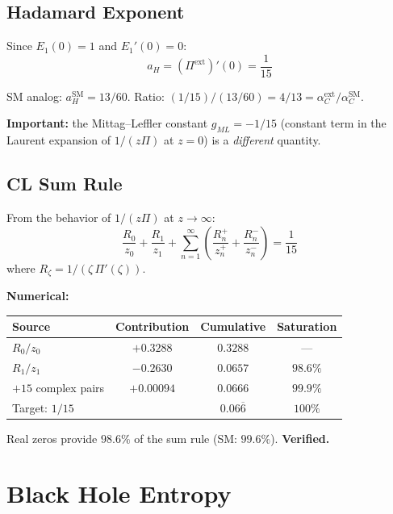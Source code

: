 \documentclass[11pt,a4paper]{article}
\newcommand{\proven}[1]{\textcolor{verified}{\textbf{#1}}}
\begin{document}
\subsection{Hadamard Exponent}

Since $E_1(0) = 1$ and $E_1'(0) = 0$:
\begin{equation}
  \boxed{a_H = (\Pi^{\mathrm{ext}})'(0) = \frac{1}{15}}
\end{equation}

SM analog: $a_H^{\mathrm{SM}} = 13/60$. Ratio: $(1/15)/(13/60) = 4/13 = \alpha_C^{\mathrm{ext}}/\alpha_C^{\mathrm{SM}}$.

\textbf{Important:} the Mittag--Leffler constant $g_{ML} = -1/15$ (constant term in the
Laurent expansion of $1/(z\Pi)$ at $z=0$) is a \emph{different} quantity.

\subsection{CL Sum Rule}

From the behavior of $1/(z\Pi)$ at $z \to \infty$:
\begin{equation}
  \boxed{
    \frac{R_0}{z_0} + \frac{R_1}{z_1}
    + \sum_{n=1}^{\infty}\left(\frac{R_n^+}{z_n^+} + \frac{R_n^-}{z_n^-}\right)
    = \frac{1}{15}
  }
\end{equation}
where $R_\zeta = 1/(\zeta\,\Pi'(\zeta))$.

\medskip\noindent
\textbf{Numerical:}
\begin{center}
\begin{tabular}{lccc}
\toprule
Source & Contribution & Cumulative & Saturation \\
\midrule
$R_0/z_0$ & $+0.3288$ & $0.3288$ & --- \\
$R_1/z_1$ & $-0.2630$ & $0.0657$ & $98.6\%$ \\
$+15$ complex pairs & $+0.00094$ & $0.0666$ & $99.9\%$ \\
\midrule
Target: $1/15$ & & $0.06\overline{6}$ & $100\%$ \\
\bottomrule
\end{tabular}
\end{center}

Real zeros provide $98.6\%$ of the sum rule (SM: $99.6\%$). \proven{Verified.}


\section{Black Hole Entropy}
\end{document}
